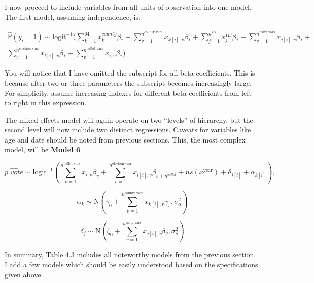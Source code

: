 \documentclass[12pt,twoside]{reedthesis}
\begin{document}
  I now proceed to include variables from all units of observation into
  one model. The first model, assuming independence, is:
  
  \begin{multline*}
  \hat{\mathbb{P}}(y_i = 1) \sim \text{logit}^{-1}(\sum_{k = 1}^{64}x_{k}^{county}\beta_{*} + \sum_{v=1}^{n^{\text{county vars}}}x_{k[i], v}\beta_{*} + \sum_{j = 1}^{n^{ID}}x_{j}^{ID}\beta_{*} + \sum_{v=1}^{n^{\text{indiv vars}}}x_{j[i], v}\beta_{*} + \\
  \sum_{v=1}^{n^{\text{election vars}}}x_{l[i], v}\beta_{*} + \sum_{v = 1}^{n^{\text{ballot vars}}}x_{i,v}\beta_{*})
  \end{multline*}
  
  You will notice that I have omitted the subscript for all beta
  coefficients. This is because after two or three parameters the
  subscript becomes increasingly large. For simplicity, assume increasing
  indexes for different beta coefficients from left to right in this
  expression.
  
  The mixed effects model will again operate on two ``levels'' of
  hierarchy, but the second level will now include two distinct
  regressions. Caveats for variables like age and date should be noted
  from previous sections. This, the most complex model, will be
  \textbf{Model 6}
  
  \begin{equation} \tag{Model 6}
  \hat{p\_vote} \sim \text{logit}^{-1}(\sum_{v = 1}^{n^{\text{ballot vars}}}x_{i,v}\beta_{v} + \sum_{v=1}^{n^{\text{election vars}}}x_{l[i], v}\beta_{v+n^{ballot}} + ns(x^{\text{year}}) +\delta_{j[i]} + \alpha_{k[i]}),
  \end{equation}
  
  \[\alpha_{k} \sim \text{N}(\gamma_0 + \sum_{v=1}^{n^{\text{county vars}}}x_{k[i], v}\gamma_{v}, \sigma_{\alpha}^2)\]
  
  \[\delta_{j} \sim \text{N}(\zeta_0 + \sum_{v=1}^{n^{\text{indiv vars}}}x_{j[i], v}\delta_{v}, \sigma_{\delta}^2)\]
  
  In summary, Table 4.3 includes all noteworthy models from the previous
  section. I add a few models which should be easily understood based on
  the specifications given above.
  
\end{document}
